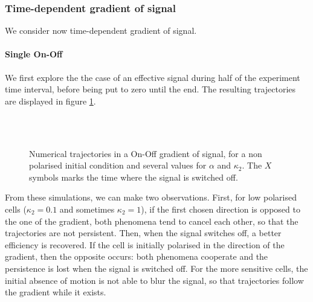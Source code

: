 \documentclass[a4paper,11pt]{article}
\begin{document}
	
	
	
	
	
	
	
	
	
	
	
	\subsubsection{Time-dependent gradient of signal}
	We consider now time-dependent gradient of signal. 
	
	\paragraph{Single On-Off}
	We first explore the the case of an effective signal during half of the experiment time interval, before being put to zero until the end. The resulting trajectories are displayed in figure \ref{fig:OnOff}.
	
	\begin{figure}[H]
	\centering
	\quad
	\\	
		\quad
	\\	
	\caption{Numerical trajectories in a On-Off gradient of signal, for a non polarised initial condition and several values for $\alpha$ and $\kappa_2$. The $X$ symbols marks the time where the signal is switched off.}\label{fig:OnOff}
\end{figure}







From these simulations, we can make two observations. First, for low polarised cells ($\kappa_2=0.1$ and sometimes $\kappa_2=1$), if the first chosen direction is opposed to the one of the gradient, both phenomena tend to cancel each other, so that the trajectories are not persistent. Then, when the signal switches off, a better efficiency is recovered. 
If the cell is initially polarised in the direction of the gradient, then the opposite occurs: both phenomena cooperate and the persistence is lost when the signal is switched off. For the more sensitive cells, the initial absence of motion is not able to blur the signal, so that trajectories follow the gradient while it exists. 
\end{document}
